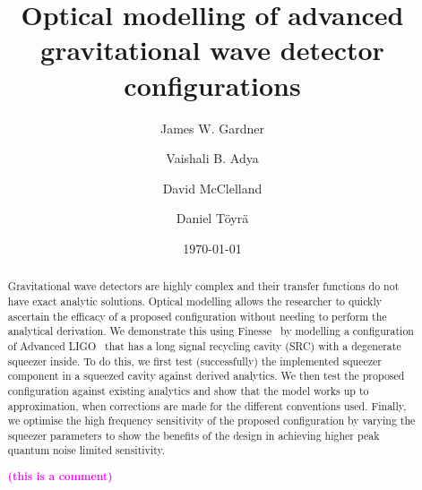 \documentclass[aps,pra,superscriptaddress,reprint,nofootinbib]{revtex4-1}
\newcommand{\jam}[1]{\textcolor{magenta}{\textbf{#1}}}
\begin{document}
\title{Optical modelling of advanced gravitational wave detector configurations}

\author{James W. Gardner}

\author{Vaishali B. Adya}

\author{David McClelland}

\author{Daniel Töyrä}

\date{\today}


\begin{abstract}

Gravitational wave detectors are highly complex and their transfer functions do not have exact analytic solutions. Optical modelling allows the researcher to quickly ascertain the efficacy of a proposed configuration without needing to perform the analytical derivation. We demonstrate this using Finesse~\cite{finesse} by modelling a configuration of Advanced LIGO~\cite{AdvancedLIGO:2015} that has a long signal recycling cavity (SRC) with a degenerate squeezer inside. To do this, we first test (successfully) the implemented squeezer component in a squeezed cavity against derived analytics. We then test the proposed configuration against existing analytics and show that the model works up to approximation, when corrections are made for the different conventions used. Finally, we optimise the high frequency sensitivity of the proposed configuration by varying the squeezer parameters to show the benefits of the design in achieving higher peak quantum noise limited sensitivity.


\jam{(this is a comment)}

\end{abstract}
\end{document}

